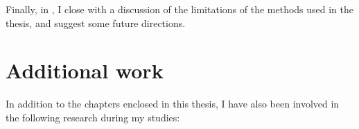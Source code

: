 %
%
Finally, in , I close with a discussion of the
limitations of the methods used in the thesis, and suggest some future
directions.

\section{\uppercase{A}dditional work}
In addition to the chapters enclosed in this thesis, I have also been involved in the following research during my studies:\\







